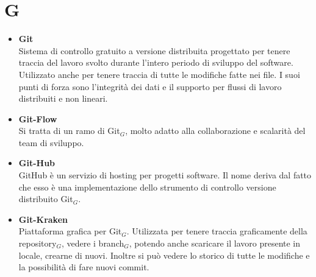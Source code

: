\chapter{G} \label{G}
\begin{itemize}
	\item \textbf{Git}\\
	Sistema di controllo gratuito a versione distribuita progettato per tenere traccia del lavoro svolto durante l'intero periodo di sviluppo del software.
	Utilizzato anche per tenere traccia di tutte le modifiche fatte nei file.
	I suoi punti di forza sono l'integrità dei dati e il supporto per flussi di lavoro distribuiti e non lineari.

	\item \textbf{Git-Flow}\\
	Si tratta di un ramo di Git$_G$, molto adatto alla collaborazione e scalarità del team di sviluppo.
	
	\item \textbf{Git-Hub}\\
	GitHub è un servizio di hosting per progetti software. Il nome deriva dal fatto che esso è una implementazione dello strumento di controllo versione distribuito Git$_G$.
	
	\item \textbf{Git-Kraken}\\
	Piattaforma grafica per Git$_G$.
	Utilizzata per tenere traccia graficamente della repository$_G$, vedere i branch$_G$, potendo anche scaricare il lavoro presente in locale, crearne di nuovi.
	Inoltre si può vedere lo storico di tutte le modifiche e la possibilità di fare nuovi commit.
	\end{itemize}